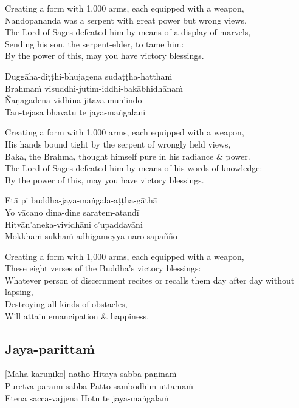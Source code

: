 \begin{english}
  Creating a form with 1,000 arms, each equipped with a weapon,\\
  Nandopananda was a serpent with great power but wrong views.\\
  The Lord of Sages defeated him by means of a display of marvels,\\
  Sending his son, the serpent-elder, to tame him:\\
  By the power of this, may you have victory blessings.
\end{english}

Duggāha-diṭṭhi-bhujagena sudaṭṭha-hatthaṁ\\
Brahmaṁ visuddhi-jutim-iddhi-bakābhidhānaṁ\\
Ñāṇāgadena vidhinā jitavā mun’indo\\
Tan-tejasā bhavatu te jaya-maṅgalāni

\begin{english}
  Creating a form with 1,000 arms, each equipped with a weapon,\\
  His hands bound tight by the serpent of wrongly held views,\\
  Baka, the Brahma, thought himself pure in his radiance \& power.\\
  The Lord of Sages defeated him by means of his words of knowledge:\\
  By the power of this, may you have victory blessings.
\end{english}

Etā pi buddha-jaya-maṅgala-aṭṭha-gāthā\\
Yo vācano dina-dine saratem-atandī\\
Hitvān’aneka-vividhāni c’upaddavāni\\
Mokkhaṁ sukhaṁ adhigameyya naro sapañño

\begin{english}
  Creating a form with 1,000 arms, each equipped with a weapon,\\
  These eight verses of the Buddha’s victory blessings:\\
  Whatever person of discernment recites or recalls them day after day without lapsing,\\
  Destroying all kinds of obstacles,\\
  Will attain emancipation \& happiness.
\end{english}

\suttaRef{[Trad]}

\subsection{Jaya-parittaṁ}
\label{jaya-parittam}
[Mahā-kāruṇiko] nātho Hitāya sabba-pāṇinaṁ\\
Pūretvā pāramī sabbā Patto sambodhim-uttamaṁ\\
Etena sacca-vajjena Hotu te jaya-maṅgalaṁ

